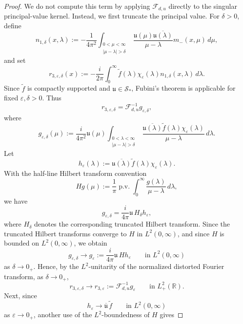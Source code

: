 \documentclass[10pt]{article}
\numberwithin{equation}{section}
\numberwithin{theorem}{section}
\begin{document}
\begin{proof}
We do not compute this term by applying \(\mathcal F_{d,u}\) directly to the singular
principal-value kernel. Instead, we first truncate the principal value. For
\(\delta>0\), define
\[
n_{1,\delta}(x,\lambda)
:=
-\frac1{4\pi^2}
\int_{\substack{0<\mu<\infty\\ |\mu-\lambda|>\delta}}
\frac{\mathfrak u(\mu)\overline{\mathfrak u(\lambda)}}{\mu-\lambda}
m_-(x,\mu)\,d\mu ,
\]
and set
\begin{equation}
\label{eq:Xstar-r3-eps-delta}
r_{3,\varepsilon,\delta}(x)
:=
-\frac{i}{2\pi}
\int_0^\infty
\widetilde f(\lambda)\chi_\varepsilon(\lambda)
n_{1,\delta}(x,\lambda)\,d\lambda .
\end{equation}
Since \(\widetilde f\) is compactly supported and \(\mathfrak u\in\mathcal S_*\), Fubini's
theorem is applicable for fixed \(\varepsilon,\delta>0\). Thus
\begin{equation}
\label{eq:Xstar-r3-eps-delta-inverse}
r_{3,\varepsilon,\delta}
=
\mathcal F_{d,u}^{-1}g_{\varepsilon,\delta},
\end{equation}
where
\begin{equation}
\label{eq:Xstar-g-eps-delta}
g_{\varepsilon,\delta}(\mu)
:=
\frac{i}{4\pi^2}\mathfrak u(\mu)
\int_{\substack{0<\lambda<\infty\\ |\mu-\lambda|>\delta}}
\frac{\overline{\mathfrak u(\lambda)}
\widetilde f(\lambda)\chi_\varepsilon(\lambda)}
{\mu-\lambda}\,d\lambda .
\end{equation}
Let
\[
h_\varepsilon(\lambda)
:=
\overline{\mathfrak u(\lambda)}
\widetilde f(\lambda)\chi_\varepsilon(\lambda).
\]
With the half-line Hilbert transform convention
\[
Hg(\mu)
:=
\frac1\pi\operatorname{p.v.}
\int_0^\infty\frac{g(\lambda)}{\mu-\lambda}\,d\lambda,
\]
we have
\[
g_{\varepsilon,\delta}
=
\frac{i}{4\pi}\mathfrak u\,H_\delta h_\varepsilon,
\]
where \(H_\delta\) denotes the corresponding truncated Hilbert transform. Since the
truncated Hilbert transforms converge to \(H\) in \(L^2(0,\infty)\), and since \(H\) is
bounded on \(L^2(0,\infty)\), we obtain
\[
g_{\varepsilon,\delta}
\longrightarrow
g_\varepsilon
:=
\frac{i}{4\pi}\mathfrak u\,Hh_\varepsilon
\qquad\text{in }L^2(0,\infty)
\]
as \(\delta\to0_+\). Hence, by the \(L^2\)-unitarity of the normalized distorted Fourier
transform, as \(\delta\to0_+\),
\[
r_{3,\varepsilon,\delta}
\longrightarrow
r_{3,\varepsilon}
:=
\mathcal F_{d,u}^{-1}g_\varepsilon
\qquad\text{in }L^2_+(\mathbb R).
\]
Next, since
\[
h_\varepsilon
\to
\overline{\mathfrak u}\,\widetilde f
\qquad\text{in }L^2(0,\infty)
\]
as \(\varepsilon\to0_{+}\), another use of the \(L^2\)-boundedness of \(H\) gives

\end{proof}
\end{document}
